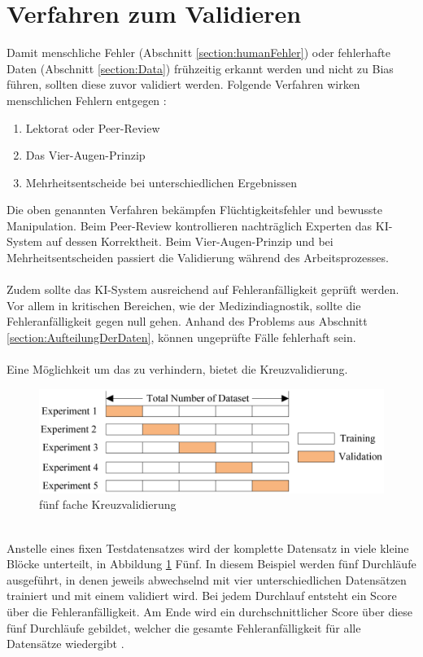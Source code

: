 \documentclass[12pt,oneside,a4paper,parskip]{scrbook}
\begin{document}
\section{Verfahren zum Validieren}
\label{section:validate}

Damit menschliche Fehler (Abschnitt \ref{section:humanFehler}) oder fehlerhafte Daten (Abschnitt \ref{section:Data}) frühzeitig erkannt werden und nicht zu Bias führen, sollten diese zuvor validiert werden. Folgende Verfahren wirken menschlichen Fehlern entgegen \cite{trainingsDataKI}:
\begin{enumerate}
	\item Lektorat oder Peer-Review
	\item Das Vier-Augen-Prinzip
	\item Mehrheitsentscheide bei unterschiedlichen Ergebnissen
\end{enumerate}
Die oben genannten Verfahren bekämpfen Flüchtigkeitsfehler und bewusste Manipulation. Beim Peer-Review kontrollieren nachträglich Experten das KI-System auf dessen Korrektheit. Beim Vier-Augen-Prinzip und bei Mehrheitsentscheiden passiert die Validierung während des Arbeitsprozesses.
\\\\
Zudem sollte das KI-System ausreichend auf Fehleranfälligkeit geprüft werden. Vor allem in kritischen Bereichen, wie der Medizindiagnostik, sollte die Fehleranfälligkeit gegen null gehen. Anhand des Problems aus Abschnitt \ref{section:AufteilungDerDaten}, können ungeprüfte Fälle fehlerhaft sein.
\\\\
Eine Möglichkeit um das zu verhindern, bietet die Kreuzvalidierung.
\begin{figure}[h]
	\begin{center}
		\includegraphics[width=15cm]{Bilder/crossValidierung.png}
		\caption{fünf fache Kreuzvalidierung\cite{towardData}}
		\label{fig:crossValidierung}
	\end{center}
\end{figure}
\\
Anstelle eines fixen Testdatensatzes wird der komplette Datensatz in viele kleine Blöcke unterteilt, in Abbildung \ref{fig:crossValidierung} Fünf. In diesem Beispiel werden fünf Durchläufe ausgeführt, in denen jeweils abwechselnd mit vier unterschiedlichen Datensätzen trainiert und mit einem validiert wird. Bei jedem Durchlauf entsteht ein Score über die Fehleranfälligkeit. Am Ende wird ein durchschnittlicher Score über diese fünf Durchläufe gebildet, welcher die gesamte Fehleranfälligkeit für alle Datensätze wiedergibt \cite{towardData}.
\end{document}
